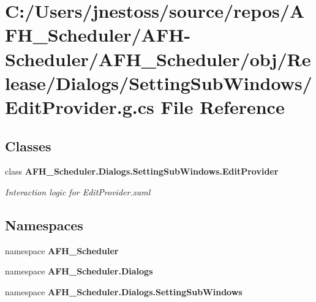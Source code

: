 \section{C\+:/\+Users/jnestoss/source/repos/\+A\+F\+H\+\_\+\+Scheduler/\+A\+F\+H-\/\+Scheduler/\+A\+F\+H\+\_\+\+Scheduler/obj/\+Release/\+Dialogs/\+Setting\+Sub\+Windows/\+Edit\+Provider.g.\+cs File Reference}
\label{_release_2_dialogs_2_setting_sub_windows_2_edit_provider_8g_8cs}
\subsection*{Classes}
\begin{DoxyCompactItemize}
\item 
class \textbf{ A\+F\+H\+\_\+\+Scheduler.\+Dialogs.\+Setting\+Sub\+Windows.\+Edit\+Provider}
\begin{DoxyCompactList}\small\item\em Interaction logic for Edit\+Provider.\+xaml \end{DoxyCompactList}\end{DoxyCompactItemize}
\subsection*{Namespaces}
\begin{DoxyCompactItemize}
\item 
namespace \textbf{ A\+F\+H\+\_\+\+Scheduler}
\item 
namespace \textbf{ A\+F\+H\+\_\+\+Scheduler.\+Dialogs}
\item 
namespace \textbf{ A\+F\+H\+\_\+\+Scheduler.\+Dialogs.\+Setting\+Sub\+Windows}
\end{DoxyCompactItemize}
